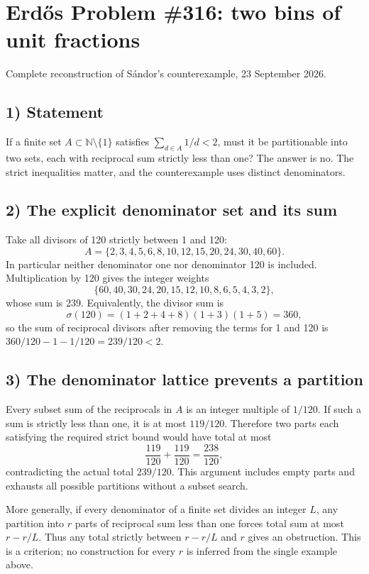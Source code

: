 \section{Erd\H{o}s Problem \#316: two bins of unit fractions}
\noindent Complete reconstruction of S\'andor's counterexample, 23 September 2026.

\subsection*{1) Statement}
If a finite set $A\subset\mathbb N\setminus\{1\}$ satisfies $\sum_{d\in A}1/d<2$, must it be partitionable into two sets, each with reciprocal sum strictly less than one? The answer is no. The strict inequalities matter, and the counterexample uses distinct denominators.

\subsection*{2) The explicit denominator set and its sum}
Take all divisors of 120 strictly between 1 and 120:
\[
 A=\{2,3,4,5,6,8,10,12,15,20,24,30,40,60\}.
\]
In particular neither denominator one nor denominator 120 is included. Multiplication by 120 gives the integer weights
\[
 \{60,40,30,24,20,15,12,10,8,6,5,4,3,2\},
\]
whose sum is $239$. Equivalently, the divisor sum is
\[
 \sigma(120)=(1+2+4+8)(1+3)(1+5)=360,
\]
so the sum of reciprocal divisors after removing the terms for 1 and 120 is $360/120-1-1/120=239/120<2$.

\subsection*{3) The denominator lattice prevents a partition}
Every subset sum of the reciprocals in $A$ is an integer multiple of $1/120$. If such a sum is strictly less than one, it is at most $119/120$. Therefore two parts each satisfying the required strict bound would have total at most
\[
 \frac{119}{120}+\frac{119}{120}=\frac{238}{120},
\]
contradicting the actual total $239/120$. This argument includes empty parts and exhausts all possible partitions without a subset search.

More generally, if every denominator of a finite set divides an integer $L$, any partition into $r$ parts of reciprocal sum less than one forces total sum at most $r-r/L$. Thus any total strictly between $r-r/L$ and $r$ gives an obstruction. This is a criterion; no construction for every $r$ is inferred from the single example above.

